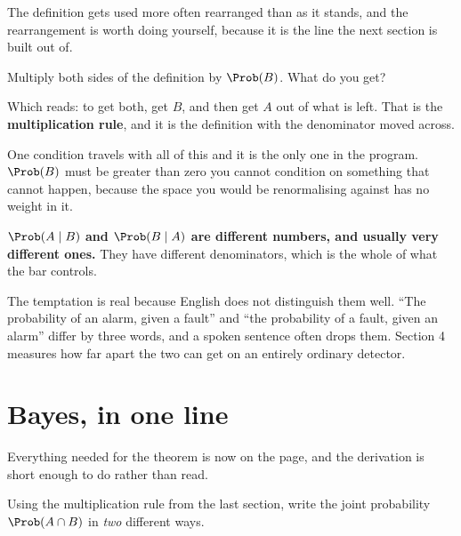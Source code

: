 \begin{fr}
The definition gets used more often rearranged than as it stands, and the
rearrangement is worth doing yourself, because it is the line the next section
is built out of.

Multiply both sides of the definition by $\Prob(B)$. What do you get?
\dotline
\nextframe
\end{fr}

\begin{fr}

Which reads: to get both, get $B$, and then get $A$ out of what is left. That
is the \textbf{multiplication rule}, and it is the definition with the
denominator moved across.

One condition travels with all of this and it is the only one in the program.
$\Prob(B)$ must be greater than zero \dash{} you cannot condition on something
that cannot happen, because the space you would be renormalising against has no
weight in it.

\begin{trapbox}
\textbf{$\Prob(A \mid B)$ and $\Prob(B \mid A)$ are different numbers, and
usually very different ones.} They have different denominators, which is the
whole of what the bar controls.

The temptation is real because English does not distinguish them well.
\enquote{The probability of an alarm, given a fault} and \enquote{the
probability of a fault, given an alarm} differ by three words, and a spoken
sentence often drops them. Section 4 measures how far apart the two can get on
an entirely ordinary detector.
\end{trapbox}

\end{fr}

\section{Bayes, in one line}
\label{sec:P23-bayes}

\begin{fr}
Everything needed for the theorem is now on the page, and the derivation is
short enough to do rather than read.

Using the multiplication rule from the last section, write the joint
probability $\Prob(A \cap B)$ in \emph{two} different ways.
\dotline
\nextframe
\end{fr}

